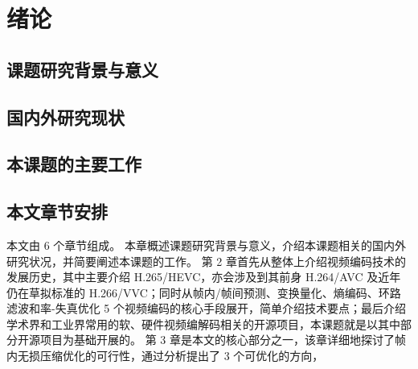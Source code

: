 \chapter{绪论}
\label{cha:c1}

\section{课题研究背景与意义}

\section{国内外研究现状}

\section{本课题的主要工作}

\section{本文章节安排}
本文由 6 个章节组成。
    本章概述课题研究背景与意义，介绍本课题相关的国内外研究状况，并简要阐述本课题的工作。
第 2 章首先从整体上介绍视频编码技术的发展历史，其中主要介绍 H.265/HEVC，亦会涉及到其前身 H.264/AVC 及近年仍在草拟标准的 H.266/VVC；同时从帧内/帧间预测、变换量化、熵编码、环路滤波和率-失真优化 5 个视频编码的核心手段展开，简单介绍技术要点；最后介绍学术界和工业界常用的软、硬件视频编解码相关的开源项目，本课题就是以其中部分开源项目为基础开展的。
第 3 章是本文的核心部分之一，该章详细地探讨了帧内无损压缩优化的可行性，通过分析提出了 3 个可优化的方向，
